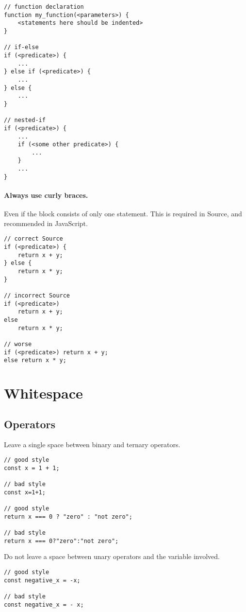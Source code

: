 \begin{lstlisting}
// function declaration
function my_function(<parameters>) {
    <statements here should be indented>
}

// if-else
if (<predicate>) {
    ...
} else if (<predicate>) {
    ...
} else {
    ...
}

// nested-if
if (<predicate>) {
    ...
    if (<some other predicate>) {
        ...
    }
    ...
}
\end{lstlisting}

\paragraph{Always use curly braces.} Even if the block consists of only 
  one statement.
  This is required in Source, and recommended in JavaScript.

\begin{lstlisting}
// correct Source
if (<predicate>) {
    return x + y;
} else {
    return x * y;
}

// incorrect Source
if (<predicate>) 
    return x + y;
else 
    return x * y;

// worse
if (<predicate>) return x + y;
else return x * y;
\end{lstlisting}

\section*{Whitespace}

  \subsection*{Operators}
    Leave a single space between binary and ternary operators.
	
\begin{lstlisting}
// good style
const x = 1 + 1;

// bad style
const x=1+1;

// good style
return x === 0 ? "zero" : "not zero";

// bad style
return x === 0?"zero":"not zero";
\end{lstlisting}
	
	Do not leave a space between unary operators and the variable involved.

\begin{lstlisting}
// good style
const negative_x = -x;

// bad style
const negative_x = - x;
\end{lstlisting}

